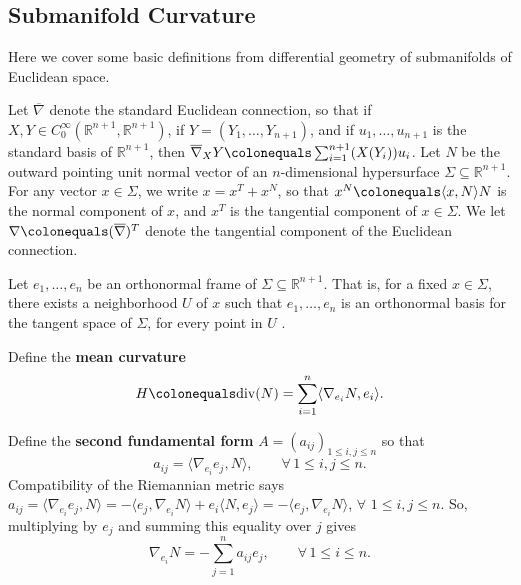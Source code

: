 \documentclass[12pt,reqno]{amsart}
\theoremstyle{definition}
\renewcommand{\subset}{\subseteq}
\newcommand{\R}{\mathbb{R}}
\newcommand{\embolden}[1]{\textbf {#1}}
\newcommand{\sdimn}{n}
\newcommand{\adimn}{n+1}
\begin{document}
\subsection{Submanifold Curvature}\label{seccurvature}

Here we cover some basic definitions from differential geometry of submanifolds of Euclidean space.

Let $\overline{\nabla}$ denote the standard Euclidean connection, so that if $X,Y\in C_{0}^{\infty}(\R^{\adimn},\R^{\adimn})$, if $Y=(Y_{1},\ldots,Y_{\adimn})$, and if $u_{1},\ldots,u_{\adimn}$ is the standard basis of $\R^{\adimn}$, then $\overline{\nabla}_{X}Y\colonequals\sum_{i=1}^{\adimn}(X (Y_{i}))u_{i}$.  Let $N$ be the outward pointing unit normal vector of an $\sdimn$-dimensional hypersurface $\Sigma\subset\R^{\adimn}$.  For any vector $x\in\Sigma$, we write $x=x^{T}+x^{N}$, so that $x^{N}\colonequals\langle x,N\rangle N$ is the normal component of $x$, and $x^{T}$ is the tangential component of $x\in\Sigma$.  We let $\nabla\colonequals(\overline{\nabla})^{T}$ denote the tangential component of the Euclidean connection.

Let $e_{1},\ldots,e_{\sdimn}$ be an orthonormal frame of $\Sigma\subset\R^{\adimn}$.  That is, for a fixed $x\in\Sigma$, there exists a neighborhood $U$ of $x$ such that $e_{1},\ldots,e_{\sdimn}$ is an orthonormal basis for the tangent space of $\Sigma$, for every point in $U$ \cite[Proposition 11.17]{lee03}.

Define the \embolden{mean curvature}
\begin{equation}\label{three0.5}
H\colonequals\mathrm{div}(N)=\sum_{i=1}^{\sdimn}\langle\nabla_{e_{i}}N,e_{i}\rangle.
\end{equation}

Define the \embolden{second fundamental form} $A=(a_{ij})_{1\leq i,j\leq\sdimn}$ so that
\begin{equation}\label{three1}
a_{ij}=\langle\nabla_{e_{i}}e_{j},N\rangle,\qquad\forall\,1\leq i,j\leq \sdimn.
\end{equation}
Compatibility of the Riemannian metric says $a_{ij}=\langle\nabla_{e_{i}}e_{j},N\rangle=-\langle e_{j},\nabla_{e_{i}}N\rangle+ e_{i}\langle N,e_{j}\rangle=-\langle e_{j},\nabla_{e_{i}}N\rangle$, $\forall$ $1\leq i,j\leq \sdimn$.  So, multiplying by $e_{j}$ and summing this equality over $j$ gives
\begin{equation}\label{three2}
\nabla_{e_{i}}N=-\sum_{j=1}^{\sdimn}a_{ij}e_{j},\qquad\forall\,1\leq i\leq \sdimn.
\end{equation}
\end{document}
